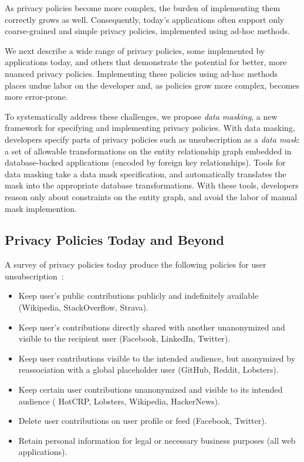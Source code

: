 As privacy policies become more complex, the burden of implementing them correctly grows as well.
Consequently, today's applications often support only coarse-grained and simple privacy policies,
implemented using ad-hoc methods.

We next describe a wide range of privacy policies, some implemented by applications today,
and others that demonstrate the potential for better, more nuanced privacy policies. Implementing
these policies using ad-hoc methods places undue labor on the developer and, as policies grow
more complex, becomes more error-prone.

To systematically address these challenges, we propose \emph{data masking}, a new framework for
specifying and implementing privacy policies. 
%
With data masking, developers specify parts of privacy policies such as unsubscription as a
\emph{data mask}: a set of allowable transformations on the entity relationship graph embedded in
database-backed applications (\eg encoded by foreign key relationships).
%
Tools for data masking take a data mask specification, and automatically translates the mask into
the appropriate database transformations. With these tools, developers reason only about constraints
on the entity graph, and avoid the labor of manual mask implemention.

\subsection{Privacy Policies Today and Beyond}
A survey of privacy policies today produce the following policies for user unsubscription~\cite{facebook:privacy, twitter:privacy, hotcrp:privacy, reddit:privacy,
github:privacy, hackernews:privacy, strava:privacy, linkedin:privacy, stackoverflow:privacy,
wikipedia:privacy, amazon:privacy, prestashop:privacy, spotify:privacy, lobsters:privacy}:
\begin{itemize}
    \item Keep user's public contributions publicly and indefinitely available (\eg Wikipedia, StackOverflow, Strava).
    \item Keep user's contributions directly shared with another unanonymized and visible to the recipient user (\eg Facebook,
        LinkedIn, Twitter).
    \item Keep user contributions visible to the intended audience, but anonymized by reassociation with a global
        placeholder user (\eg GitHub, Reddit, Lobsters).
    \item Keep certain user contributions unanonymized and visible to its intended audience (\eg
        HotCRP, Lobsters, Wikipedia, HackerNews).
    \item Delete user contributions on user profile or feed (\eg Facebook, Twitter).
    \item Retain personal information for legal or necessary business purposes (all web applications).
\end{itemize}


